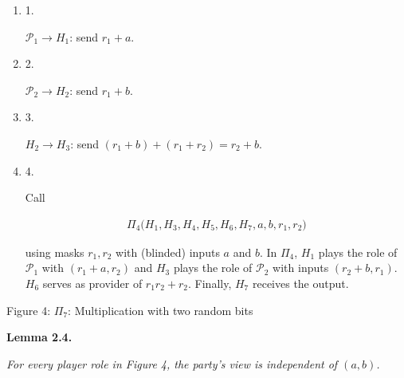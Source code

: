 \begin{enumerate}


\item[] 
1. 


$\mathcal{P}_{1}\rightarrow H_{1}$: send $r_{1}+a$.\par





\item[] 
2. 


$\mathcal{P}_{2}\rightarrow H_{2}$: send $r_{1}+b$.\par





\item[] 
3. 


$H_{2}\rightarrow H_{3}$: send $(r_{1}+b)+(r_{1}+r_{2})=r_{2}+b$.\par





\item[] 
4. 


Call\par


\[\begin{gathered}
\Pi_{4}\bigl(H_{1},H_{3},H_{4},H_{5},H_{6},H_{7},a,b,r_{1},r_{2}\bigr)
\end{gathered}\]


using masks $r_{1},r_{2}$ with (blinded) inputs $a$ and $b$. In $\Pi_{4}$, $H_{1}$ plays the role of $\mathcal{P}_{1}$ with $(r_{1}+a,r_{2})$ and $H_{3}$ plays the role of $\mathcal{P}_{2}$ with inputs $(r_{2}+b,r_{1})$. $H_{6}$ serves as provider of $r_{1}r_{2}+r_{2}$. Finally, $H_{7}$ receives the output.\par





\end{enumerate}


Figure 4: $\Pi_{7}$: Multiplication with two random bits




\par\medskip\noindent\textbf{
\textbf{Lemma 2.4}\textbf{.}
}\par



\emph{For every player role in Figure 4, the party’s view is independent of $(a,b)$.}\par



